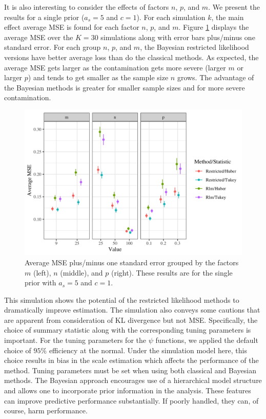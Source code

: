 \documentclass[ba]{imsart}
\begin{document}
It is also interesting to consider the effects of factors $n$, $p$, and $m$.  We present the results for a single prior ($a_s = 5$ and $c = 1$).  For each simulation $k$, the main effect average MSE is found for each factor $n$, $p$, and $m$. Figure \ref{mse_mnp} displays the average MSE over the $K = 30$ simulations along with error bars plus/minus one standard error. For each group $n$, $p$, and $m$, the Bayesian restricted likelihood versions have better average loss than do the classical methods. As expected, the average MSE gets larger as the contamination gets more severe (larger $m$ or larger $p$) and tends to get smaller as the sample size $n$ grows.  The advantage of the Bayesian methods is greater for smaller sample sizes and for more severe contamination.

\begin{figure}[t]
\centering
\includegraphics[width = 5in]{MSE_sim2_mnp.png}
\caption{Average MSE plus/minus one standard error grouped by the factors $m$ (left), $n$ (middle), and $p$ (right). These results are for the single prior with $a_s = 5$ and $c = 1$.}
\label{mse_mnp}
\end{figure}

This simulation shows the potential of the restricted likelihood methods to dramatically improve estimation.  The simulation also conveys some cautions that are apparent from consideration of KL divergence but not MSE.  Specifically, the choice of summary statistic along with the corresponding tuning parameters is important. For the tuning parameters for the $\psi$ functions, we applied the default choice of $95\%$ efficiency at the normal.  Under the simulation model here, this choice results in bias in the scale estimation which affects the performance of the method. Tuning parameters must be set when using both classical and Bayesian methods. The Bayesian approach encourages use of a hierarchical model structure and allows one to incorporate prior information in the analysis.  These features can improve predictive performance substantially.  If poorly handled, they can, of course, harm performance. 
\end{document}
